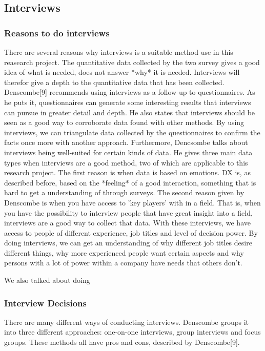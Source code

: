 \documentclass[11pt]{article}
\begin{document}
\begin{multicols}{2}
{    \subsection{Interviews}

    \subsubsection{Reasons to do interviews}
    There are several reasons why interviews is a suitable method use in this reasearch project.
    The quantitative data collected
    by the two survey gives a good idea of what is needed, does not answer *why* it is needed.
    Interviews will therefor give a depth to the quantitative data that has been collected.
    Denscombe[9] recommends using interviews as a follow-up to questionnaires. As he puts it,
    questionnaires can generate some interesting results that interviews can pursue
    in greater detail and depth. He also states that interviews should be seen as a good way
    to corroborate data found with other methods. By using interviews, we can triangulate data
    collected by the questionnaires to confirm the facts once more with another approach.
    Furthermore, Dencsombe talks about interviews being well-suited for certain kinds of data.
    He gives three main data types when interviews are a good method,
    two of which are applicable to this research project. The first reason is
    when data is based on emotions. DX is, as described before, based on the *feeling*
    of a good interaction, something that is hard to get a understanding of through
    surveys. The second reason given by Denscombe is when you have access to 'key players'
    with in a field. That is, when you have the possibility to interview people
    that have great insight into a field, interviews are a good way to collect that data.
    With these interviews, we have access to people of different experience, job titles
    and level of decision power. By doing interviews, we can get an understanding
    of why different job titles desire different things, why more experienced people
    want certain aspects and why persons with a lot of power within a company
    have needs that others don't.

    We also talked about doing

    \subsubsection{Interview Decisions}
    There are many different ways of conducting interviews. Denscombe groups it into
    three different approaches: one-on-one interviews, group interviews and focus groups.
    These methods all have pros and cons, described by Denscombe[9].

}
\end{multicols}
\end{document}
